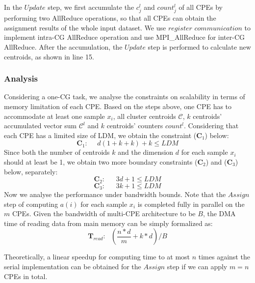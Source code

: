In the $Update$ step, we first accumulate the $c_{j}^l$ and $count_{j}^l$ of all CPEs by performing two AllReduce operations, so that all CPEs can obtain the assignment results of the whole input dataset.  We use $register$ $communication$ \cite{fang2017swdnn} to implement intra-CG AllReduce operation and use MPI\_AllReduce for inter-CG AllReduce. After the accumulation, the $Update$ step is performed to calculate new centroids, as shown in line 15.

\subsubsection*{Analysis} 
Considering a one-CG task, we analyse the constraints on scalability in terms of memory limitation of each CPE. Based on the steps above, one CPE has to accommodate at least one sample $x_i$, all cluster centroids $\mathcal{C}$, $k$ centroids' accumulated vector sum $\mathcal{C}^{l}$ and $k$ centroids' counters $count^l$. Considering that each CPE has a limited size of LDM, we obtain the constraint ($\mathbf{C}_1$) below: 
$$\mathbf{C}_1:\ \ \ \ \ \ d(1+k+k)+k \leq LDM  $$
Since both the number of centroids $k$ and the dimension $d$ for each sample $x_i$ should at least be 1, we obtain two more boundary constraints ($\mathbf{C}_2$) and ($\mathbf{C}_3$) below, separately: 
$$\mathbf{C}_2:\ \ \ \ \ \ \ 3d+1 \leq LDM  $$
$$\mathbf{C}_3:\ \ \ \ \ \ \ 3k+1 \leq LDM  $$
Now we analyse the performance under bandwidth bounds. Note that the $Assign$ step of computing $a(i)$ for each sample $x_i$ is completed fully in parallel on the $m$ CPEs. Given the bandwidth of multi-CPE architecture to be $B$, the DMA time of reading data from main memory can be simply formalized as: 
$$\mathbf{T}_{read}:\ \ \ (\frac{n*d}{m}+k*d)/B$$

Theoretically, a linear speedup for computing time to at most $n$ times against the serial implementation can be obtained for the $Assign$ step if we can apply $m = n$ CPEs in total.

